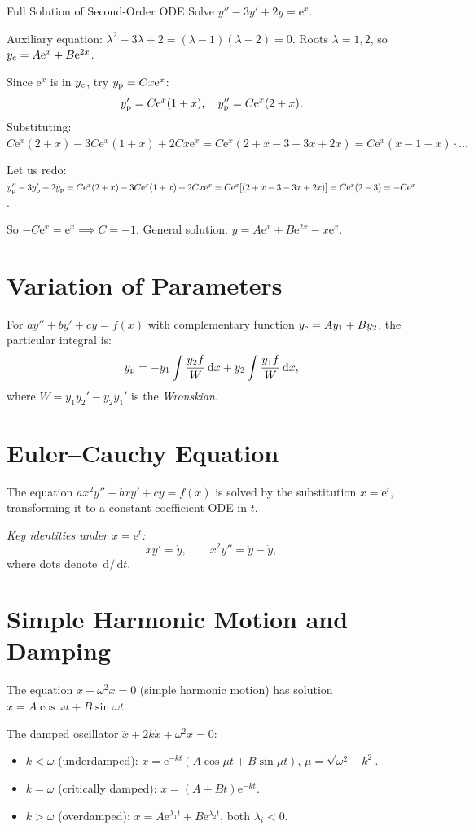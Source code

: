 \documentclass[12pt, a4paper]{book}
\newcommand{\dd}{\,\mathrm{d}}
\newcommand{\dx}{\,\mathrm{d}x}
\newcommand{\dt}{\,\mathrm{d}t}
\newcommand{\e}{\mathrm{e}}
\begin{document}
\begin{example}{Full Solution of Second-Order ODE}{}
Solve $y''-3y'+2y=\e^x$.

Auxiliary equation: $\lambda^2-3\lambda+2=(\lambda-1)(\lambda-2)=0$. Roots $\lambda=1,2$, so $y_{\rm c}=A\e^x+B\e^{2x}$.

Since $\e^x$ is in $y_{\rm c}$, try $y_{\rm p}=Cx\e^x$:
\[
y_{\rm p}'=C\e^x(1+x),\quad y_{\rm p}''=C\e^x(2+x).
\]
Substituting: $C\e^x(2+x)-3C\e^x(1+x)+2Cx\e^x=C\e^x(2+x-3-3x+2x)=C\e^x(x-1-x)\cdot... $

Let us redo: $y_{\rm p}''-3y_{\rm p}'+2y_{\rm p}=C\e^x(2+x)-3C\e^x(1+x)+2Cx\e^x=C\e^x[(2+x-3-3x+2x)]=C\e^x(2-3)=-C\e^x$.

So $-C\e^x=\e^x\implies C=-1$. General solution: $y=A\e^x+B\e^{2x}-x\e^x$.
\end{example}

\section{Variation of Parameters}

For $ay''+by'+cy=f(x)$ with complementary function $y_{\rm c}=Ay_1+By_2$, the particular integral is:
\[
y_{\rm p} = -y_1\int\frac{y_2 f}{W}\dx + y_2\int\frac{y_1 f}{W}\dx,
\]
where $W=y_1y_2'-y_2y_1'$ is the \emph{Wronskian}.

\section{Euler--Cauchy Equation}

The equation $ax^2y''+bxy'+cy=f(x)$ is solved by the substitution $x=\e^t$, transforming it to a constant-coefficient ODE in $t$.

\textit{Key identities under $x=\e^t$:}
\[
xy' = \dot{y},\qquad x^2y'' = \ddot{y}-\dot{y},
\]
where dots denote $\dd/\dt$.

\section{Simple Harmonic Motion and Damping}

The equation $\ddot{x}+\omega^2 x=0$ (simple harmonic motion) has solution $x=A\cos\omega t+B\sin\omega t$.

The damped oscillator $\ddot{x}+2k\dot{x}+\omega^2 x=0$:
\begin{itemize}
  \item $k<\omega$ (underdamped): $x=\e^{-kt}(A\cos\mu t+B\sin\mu t)$, $\mu=\sqrt{\omega^2-k^2}$.
  \item $k=\omega$ (critically damped): $x=(A+Bt)\e^{-kt}$.
  \item $k>\omega$ (overdamped): $x=A\e^{\lambda_1 t}+B\e^{\lambda_2 t}$, both $\lambda_i<0$.
\end{itemize}
\end{document}

